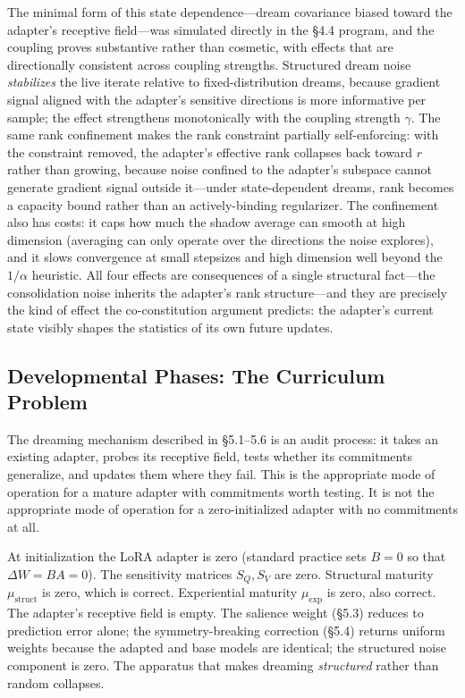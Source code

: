 \documentclass[11pt]{article}
\begin{document}
The minimal form of this state dependence---dream covariance biased toward the adapter's receptive field---was simulated directly in the \S 4.4 program, and the coupling proves substantive rather than cosmetic, with effects that are directionally consistent across coupling strengths. Structured dream noise \emph{stabilizes} the live iterate relative to fixed-distribution dreams, because gradient signal aligned with the adapter's sensitive directions is more informative per sample; the effect strengthens monotonically with the coupling strength $\gamma$. The same rank confinement makes the rank constraint partially self-enforcing: with the constraint removed, the adapter's effective rank collapses back toward $r$ rather than growing, because noise confined to the adapter's subspace cannot generate gradient signal outside it---under state-dependent dreams, rank becomes a capacity bound rather than an actively-binding regularizer. The confinement also has costs: it caps how much the shadow average can smooth at high dimension (averaging can only operate over the directions the noise explores), and it slows convergence at small stepsizes and high dimension well beyond the $1/\alpha$ heuristic. All four effects are consequences of a single structural fact---the consolidation noise inherits the adapter's rank structure---and they are precisely the kind of effect the co-constitution argument predicts: the adapter's current state visibly shapes the statistics of its own future updates.

\subsection{Developmental Phases: The Curriculum Problem}

The dreaming mechanism described in \S 5.1--5.6 is an audit process: it takes an existing adapter, probes its receptive field, tests whether its commitments generalize, and updates them where they fail. This is the appropriate mode of operation for a mature adapter with commitments worth testing. It is not the appropriate mode of operation for a zero-initialized adapter with no commitments at all.

At initialization the LoRA adapter is zero (standard practice sets $B = 0$ so that $\Delta W = BA = 0$). The sensitivity matrices $S_Q, S_V$ are zero. Structural maturity $\mu_\text{struct}$ is zero, which is correct. Experiential maturity $\mu_\text{exp}$ is zero, also correct. The adapter's receptive field is empty. The salience weight (\S 5.3) reduces to prediction error alone; the symmetry-breaking correction (\S 5.4) returns uniform weights because the adapted and base models are identical; the structured noise component is zero. The apparatus that makes dreaming \emph{structured} rather than random collapses.
\end{document}
